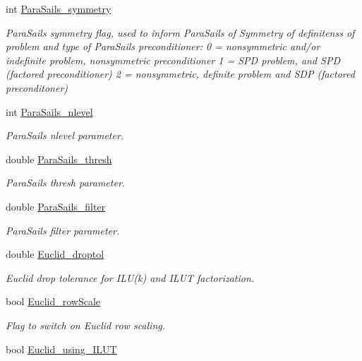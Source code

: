 \begin{DoxyCompactItemize}
int \hyperlink{classoomph_1_1HypreInterface_a3cdba8c59c318125fbb367207f1082b6}{Para\+Sails\+\_\+symmetry}
\begin{DoxyCompactList}\small\item\em Para\+Sails symmetry flag, used to inform Para\+Sails of Symmetry of definitenss of problem and type of Para\+Sails preconditioner\+: 0 = nonsymmetric and/or indefinite problem, nonsymmetric preconditioner 1 = S\+PD problem, and S\+PD (factored preconditioner) 2 = nonsymmetric, definite problem and S\+DP (factored preconditoner) \end{DoxyCompactList}\item 
int \hyperlink{classoomph_1_1HypreInterface_a313c9638a579d912e3f570b21db611f4}{Para\+Sails\+\_\+nlevel}
\begin{DoxyCompactList}\small\item\em Para\+Sails nlevel parameter. \end{DoxyCompactList}\item 
double \hyperlink{classoomph_1_1HypreInterface_a8deadae96f1791b9f2552505cc68af2d}{Para\+Sails\+\_\+thresh}
\begin{DoxyCompactList}\small\item\em Para\+Sails thresh parameter. \end{DoxyCompactList}\item 
double \hyperlink{classoomph_1_1HypreInterface_a34ee95ad2f64b9d4fb0b0951a64c357a}{Para\+Sails\+\_\+filter}
\begin{DoxyCompactList}\small\item\em Para\+Sails filter parameter. \end{DoxyCompactList}\item 
double \hyperlink{classoomph_1_1HypreInterface_af91bb7e92785e510c04cdb0c11ef99cf}{Euclid\+\_\+droptol}
\begin{DoxyCompactList}\small\item\em Euclid drop tolerance for I\+L\+U(k) and I\+L\+UT factorization. \end{DoxyCompactList}\item 
bool \hyperlink{classoomph_1_1HypreInterface_a16a2f90a3e7fcdb2909d400d82b90286}{Euclid\+\_\+row\+Scale}
\begin{DoxyCompactList}\small\item\em Flag to switch on Euclid row scaling. \end{DoxyCompactList}\item 
bool \hyperlink{classoomph_1_1HypreInterface_afe6e93b2655b578090a5d9abb91c2e22}{Euclid\+\_\+using\+\_\+\+I\+L\+UT}

\end{DoxyCompactItemize}
